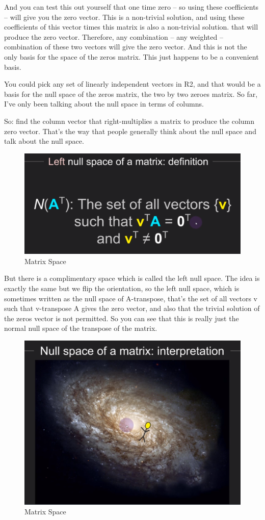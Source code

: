 \documentclass[fleqn,10pt]{olplainarticle}
\theoremstyle{definition}
\theoremstyle{remark}
\begin{document}
And you can test this out yourself that one time zero -- so using these coefficients -- will give you the zero vector. This is a non-trivial solution, and using these coefficients of this vector times this matrix is also a non-trivial solution. that will produce the zero vector. Therefore, any combination -- any weighted -- combination of these two vectors will give the zero vector. And this is not the only basis for the space of the zeros matrix. This just happens to be a convenient basis.

You could pick any set of linearly independent vectors in R2, and that would be a basis for the null space of the zeros matrix, the two by two zeroes matrix. So far, I've only been talking about the null space in terms of columns.

So: find the column vector that right-multiplies a matrix to produce the column zero vector. That's the way that people generally think about the null space and talk about the null space.

\begin{figure}[ht]
	\centering
	\includegraphics[width=0.3\linewidth]{images/matrix-space-23.png}
	\caption{Matrix Space}
	\label{fig:matrix_space_23}
\end{figure}

But there is a complimentary space which is called the left null space. The idea is exactly the same but we flip the orientation, so the left null space, which is sometimes written as the null space of A-transpose, that's the set of all vectors v such that v-transpose A gives the zero vector, and also that the trivial solution of the zeros vector is not permitted. So you can see that this is really just the normal null space of the transpose of the matrix.

\begin{figure}[ht]
	\centering
	\includegraphics[width=0.5\linewidth]{images/matrix-space-24.png}
	\caption{Matrix Space}
	\label{fig:matrix_space_24}
\end{figure}
\end{document}
